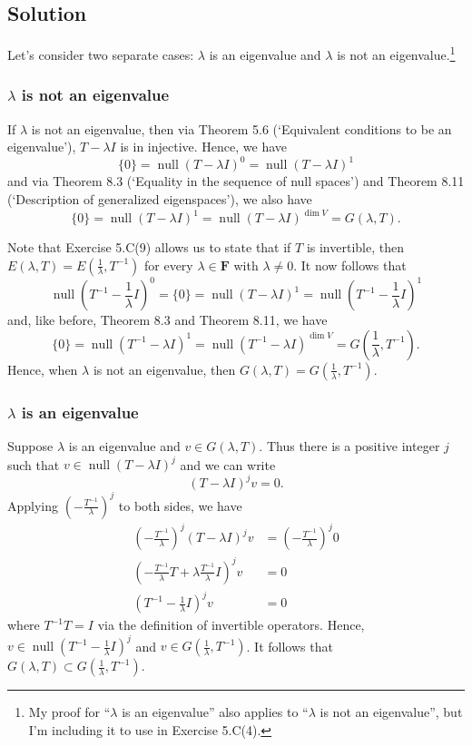 \documentclass{article}
\begin{document}
\subsection*{Solution}
Let's consider two separate cases: $\lambda$ is an eigenvalue and $\lambda$ is not an eigenvalue.\footnote{My proof for ``$\lambda$ is an eigenvalue'' also applies to ``$\lambda$ is not an eigenvalue'', but I'm including it to use in Exercise 5.C(4).}

\subsubsection*{$\lambda$ is not an eigenvalue}
If $\lambda$ is not an eigenvalue, then via Theorem 5.6 (`Equivalent conditions to be an eigenvalue'), $T-\lambda I$ is in injective. Hence, we have
\[\{0\}=\operatorname{null}(T-\lambda I)^0=\operatorname{null}(T-\lambda I)^1\]
and via Theorem 8.3 (`Equality in the sequence of null spaces') and Theorem 8.11 (`Description of generalized eigenspaces'), we also have
\[\{0\}=\operatorname{null}(T-\lambda I)^1=\operatorname{null}(T-\lambda I)^{\operatorname{dim}V}=G(\lambda,T).\]

Note that Exercise 5.C(9) allows us to state that if $T$ is invertible, then $E(\lambda,T)=E(\frac{1}{\lambda},T^{-1})$ for every $\lambda\in\mathbf{F}$ with $\lambda\neq 0$. It now follows that 
\[\operatorname{null}(T^{-1}-\frac{1}{\lambda}I)^0=\{0\}=\operatorname{null}(T-\lambda I)^1=\operatorname{null}(T^{-1}-\frac{1}{\lambda}I)^1\]
and, like before, Theorem 8.3 and Theorem 8.11, we have
\[\{0\}=\operatorname{null}(T^{-1}-\lambda I)^1=\operatorname{null}(T^{-1}-\lambda I)^{\operatorname{dim}V}=G(\frac{1}{\lambda},T^{-1}).\]
Hence, when $\lambda$ is not an eigenvalue, then $G(\lambda,T)=G(\frac{1}{\lambda},T^{-1})$.

\subsubsection*{$\lambda$ is an eigenvalue}
Suppose $\lambda$ is an eigenvalue and $v\in G(\lambda,T)$. Thus there is a positive integer $j$ such that $v\in\operatorname{null}(T-\lambda I)^j$ and we can write 
\[(T-\lambda I)^jv=0.\]
Applying $(-\frac{T^{-1}}{\lambda})^{j}$ to both sides, we have
\begin{align*}
    (-\frac{T^{-1}}{\lambda})^{j}(T-\lambda I)^jv&=(-\frac{T^{-1}}{\lambda})^{j}0 \\
    (-\frac{T^{-1}}{\lambda}T+\lambda\frac{T^{-1}}{\lambda}I)^jv&=0\\
    (T^{-1}-\frac{1}{\lambda}I)^jv&=0
\end{align*}
where $T^{-1}T=I$ via the definition of invertible operators. Hence, $v\in\operatorname{null}(T^{-1}-\frac{1}{\lambda}I)^j$ and $v\in G(\frac{1}{\lambda},T^{-1})$. It follows that $G(\lambda,T)\subset G(\frac{1}{\lambda},T^{-1})$.
\end{document}
